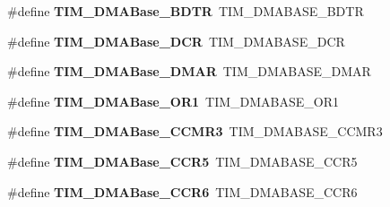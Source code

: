 \begin{DoxyCompactItemize}
\item 
\#define {\bfseries T\+I\+M\+\_\+\+D\+M\+A\+Base\+\_\+\+B\+D\+TR}~T\+I\+M\+\_\+\+D\+M\+A\+B\+A\+S\+E\+\_\+\+B\+D\+TR\hypertarget{group___h_a_l___t_i_m___aliased___defines_gaaff22bbf3091c47783c1c68b648c8605}{}\label{group___h_a_l___t_i_m___aliased___defines_gaaff22bbf3091c47783c1c68b648c8605}

\item 
\#define {\bfseries T\+I\+M\+\_\+\+D\+M\+A\+Base\+\_\+\+D\+CR}~T\+I\+M\+\_\+\+D\+M\+A\+B\+A\+S\+E\+\_\+\+D\+CR\hypertarget{group___h_a_l___t_i_m___aliased___defines_ga59e2206e4e03b9d55c9fb5a24e29b01c}{}\label{group___h_a_l___t_i_m___aliased___defines_ga59e2206e4e03b9d55c9fb5a24e29b01c}

\item 
\#define {\bfseries T\+I\+M\+\_\+\+D\+M\+A\+Base\+\_\+\+D\+M\+AR}~T\+I\+M\+\_\+\+D\+M\+A\+B\+A\+S\+E\+\_\+\+D\+M\+AR\hypertarget{group___h_a_l___t_i_m___aliased___defines_gaf2b823d37e722f9f856c654fa35eff26}{}\label{group___h_a_l___t_i_m___aliased___defines_gaf2b823d37e722f9f856c654fa35eff26}

\item 
\#define {\bfseries T\+I\+M\+\_\+\+D\+M\+A\+Base\+\_\+\+O\+R1}~T\+I\+M\+\_\+\+D\+M\+A\+B\+A\+S\+E\+\_\+\+O\+R1\hypertarget{group___h_a_l___t_i_m___aliased___defines_ga6868a38c42996b41d072025ce428c645}{}\label{group___h_a_l___t_i_m___aliased___defines_ga6868a38c42996b41d072025ce428c645}

\item 
\#define {\bfseries T\+I\+M\+\_\+\+D\+M\+A\+Base\+\_\+\+C\+C\+M\+R3}~T\+I\+M\+\_\+\+D\+M\+A\+B\+A\+S\+E\+\_\+\+C\+C\+M\+R3\hypertarget{group___h_a_l___t_i_m___aliased___defines_gaeea36845ff52e436a46a294d0d01a193}{}\label{group___h_a_l___t_i_m___aliased___defines_gaeea36845ff52e436a46a294d0d01a193}

\item 
\#define {\bfseries T\+I\+M\+\_\+\+D\+M\+A\+Base\+\_\+\+C\+C\+R5}~T\+I\+M\+\_\+\+D\+M\+A\+B\+A\+S\+E\+\_\+\+C\+C\+R5\hypertarget{group___h_a_l___t_i_m___aliased___defines_ga8e5e6af97873ab26e62274624f31adae}{}\label{group___h_a_l___t_i_m___aliased___defines_ga8e5e6af97873ab26e62274624f31adae}

\item 
\#define {\bfseries T\+I\+M\+\_\+\+D\+M\+A\+Base\+\_\+\+C\+C\+R6}~T\+I\+M\+\_\+\+D\+M\+A\+B\+A\+S\+E\+\_\+\+C\+C\+R6\hypertarget{group___h_a_l___t_i_m___aliased___defines_ga9ab65ba1f7609de8bd7bf20319e60232}{}\label{group___h_a_l___t_i_m___aliased___defines_ga9ab65ba1f7609de8bd7bf20319e60232}


\end{DoxyCompactItemize}
